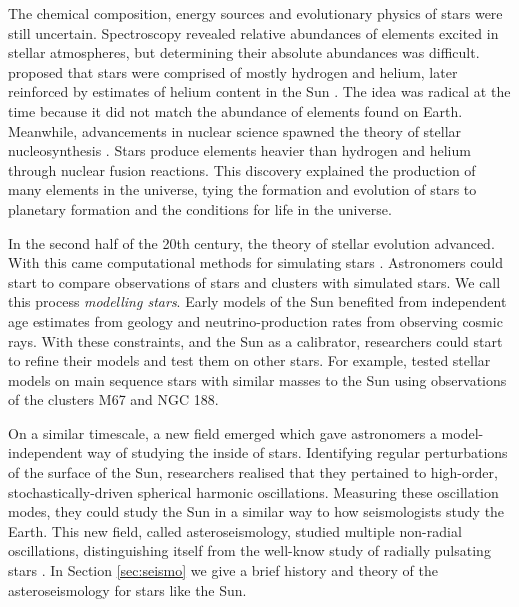 The chemical composition, energy sources and evolutionary physics of stars were still uncertain. Spectroscopy revealed relative abundances of elements excited in stellar atmospheres, but determining their absolute abundances was difficult. \citet{Payne1925} proposed that stars were comprised of mostly hydrogen and helium, later reinforced by estimates of helium content in the Sun \citep[e.g.][]{Schwarzschild1946}. The idea was radical at the time because it did not match the abundance of elements found on Earth. Meanwhile, advancements in nuclear science spawned the theory of stellar nucleosynthesis \citep{Hoyle1946}. Stars produce elements heavier than hydrogen and helium through nuclear fusion reactions. This discovery explained the production of many elements in the universe, tying the formation and evolution of stars to planetary formation and the conditions for life in the universe.

In the second half of the 20th century, the theory of stellar evolution advanced. With this came computational methods for simulating stars \citep[e.g.][]{Kippenhahn.Weigert.ea1967}. Astronomers could start to compare observations of stars and clusters with simulated stars. We call this process \emph{modelling stars}. Early models of the Sun benefited from independent age estimates from geology and neutrino-production rates from observing cosmic rays. With these constraints, and the Sun as a calibrator, researchers could start to refine their models and test them on other stars. For example, \citet{Iben1967} tested stellar models on main sequence stars with similar masses to the Sun using observations of the clusters M67 and NGC 188.

On a similar timescale, a new field emerged which gave astronomers a model-independent way of studying the inside of stars. Identifying regular perturbations of the surface of the Sun, researchers realised that they pertained to high-order, stochastically-driven spherical harmonic oscillations. Measuring these oscillation modes, they could study the Sun in a similar way to how seismologists study the Earth. This new field, called asteroseismology, studied multiple non-radial oscillations, distinguishing itself from the well-know study of radially pulsating stars \citep[e.g. Cepheid variables;][]{Leavitt1908}. In Section \ref{sec:seismo} we give a brief history and theory of the asteroseismology for stars like the Sun.


